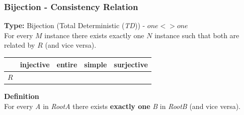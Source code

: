 \documentclass{beamer}
\newcommand{\cmark}{\ding{51}}%
\begin{document}
\begin{frame}
\frametitle{Bijection - \textbf{Consistency Relation}}

\textbf{Type:} Bijection (Total Deterministic (\textit{TD})) -  $one <> one$\\

For every $M$ instance there
exists exactly one $N$ instance such that both are related by $R$ (and vice versa).


\begin{center}
\begin{tabular}{| c | c | c | c | c | }
  \hline                        
   & injective & entire & simple & surjective \\
  \hline 
  $R$ & \cmark & \cmark & \cmark & \cmark\\
  \hline  
\end{tabular}
\end{center}


\textbf{Definition}\\

For every \textit{A} in \textit{RootA} there
exists \textbf{exactly one} \textit{B} in \textit{RootB} (and vice versa).


\end{frame}
\end{document}
